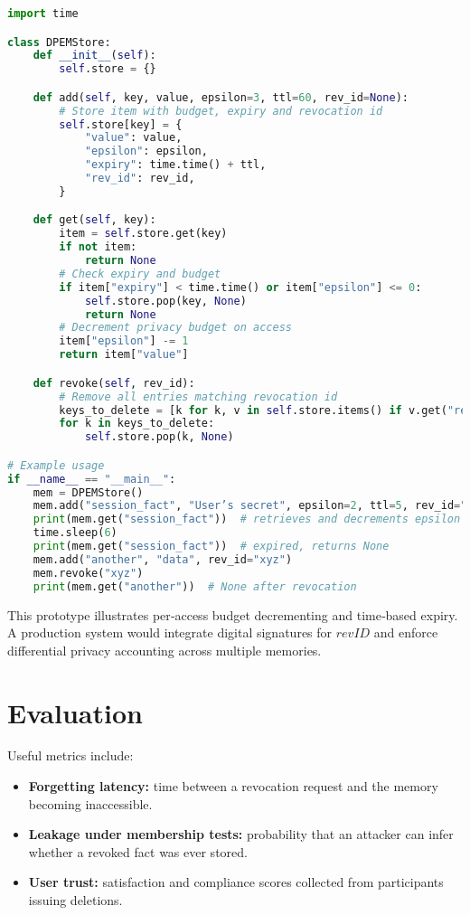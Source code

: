 \documentclass{article}
\begin{document}
\begin{lstlisting}[language=Python, caption={Prototype of a DPEM store.}, label={lst:dpem}]
import time

class DPEMStore:
    def __init__(self):
        self.store = {}

    def add(self, key, value, epsilon=3, ttl=60, rev_id=None):
        # Store item with budget, expiry and revocation id
        self.store[key] = {
            "value": value,
            "epsilon": epsilon,
            "expiry": time.time() + ttl,
            "rev_id": rev_id,
        }

    def get(self, key):
        item = self.store.get(key)
        if not item:
            return None
        # Check expiry and budget
        if item["expiry"] < time.time() or item["epsilon"] <= 0:
            self.store.pop(key, None)
            return None
        # Decrement privacy budget on access
        item["epsilon"] -= 1
        return item["value"]

    def revoke(self, rev_id):
        # Remove all entries matching revocation id
        keys_to_delete = [k for k, v in self.store.items() if v.get("rev_id") == rev_id]
        for k in keys_to_delete:
            self.store.pop(k, None)

# Example usage
if __name__ == "__main__":
    mem = DPEMStore()
    mem.add("session_fact", "User’s secret", epsilon=2, ttl=5, rev_id="abc123")
    print(mem.get("session_fact"))  # retrieves and decrements epsilon
    time.sleep(6)
    print(mem.get("session_fact"))  # expired, returns None
    mem.add("another", "data", rev_id="xyz")
    mem.revoke("xyz")
    print(mem.get("another"))  # None after revocation
\end{lstlisting}

This prototype illustrates per‑access budget decrementing and time‑based expiry.  A production system would integrate digital signatures for $\mathit{revID}$ and enforce differential privacy accounting across multiple memories.

\section{Evaluation}
Useful metrics include:
\begin{itemize}
  \item \textbf{Forgetting latency:} time between a revocation request and the memory becoming inaccessible.
  \item \textbf{Leakage under membership tests:} probability that an attacker can infer whether a revoked fact was ever stored.
  \item \textbf{User trust:} satisfaction and compliance scores collected from participants issuing deletions.
\end{itemize}
\end{document}
